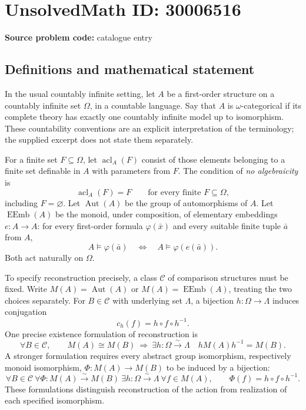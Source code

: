 \documentclass[11pt]{article}
\begin{document}
\section*{UnsolvedMath ID: 30006516}
\textbf{Source problem code:} catalogue entry
\subsection{Definitions and mathematical statement}
In the usual countably infinite setting, let \(A\) be a first-order structure on a countably infinite set \(\Omega\), in a countable language. Say that \(A\) is \(\omega\)-categorical if its complete theory has exactly one countably infinite model up to isomorphism. These countability conventions are an explicit interpretation of the terminology; the supplied excerpt does not state them separately.

For a finite set \(F\subseteq\Omega\), let \(\operatorname{acl}_A(F)\) consist of those elements belonging to a finite set definable in \(A\) with parameters from \(F\). The condition of \emph{no algebraicity} is
\[
\operatorname{acl}_A(F)=F\qquad\text{for every finite }F\subseteq\Omega,
\]
including \(F=\varnothing\). Let \(\operatorname{Aut}(A)\) be the group of automorphisms of \(A\). Let \(\operatorname{EEmb}(A)\) be the monoid, under composition, of elementary embeddings \(e:A\to A\): for every first-order formula \(\varphi(\bar x)\) and every suitable finite tuple \(\bar a\) from \(A\),
\[
A\models\varphi(\bar a)\quad\Longleftrightarrow\quad A\models\varphi(e(\bar a)).
\]
Both act naturally on \(\Omega\).

To specify reconstruction precisely, a class \(\mathcal C\) of comparison structures must be fixed. Write \(M(A)=\operatorname{Aut}(A)\) or \(M(A)=\operatorname{EEmb}(A)\), treating the two choices separately. For \(B\in\mathcal C\) with underlying set \(\Lambda\), a bijection \(h:\Omega\to\Lambda\) induces conjugation
\[
c_h(f)=h\circ f\circ h^{-1}.
\]
One precise existence formulation of reconstruction is
\[
\forall B\in\mathcal C,\qquad
M(A)\cong M(B)\ \Longrightarrow\
\exists h:\Omega\xrightarrow{\sim}\Lambda\quad
hM(A)h^{-1}=M(B).
\]
A stronger formulation requires every abstract group isomorphism, respectively monoid isomorphism, \(\Phi:M(A)\to M(B)\) to be induced by a bijection:
\[
\forall B\in\mathcal C\ \forall\Phi:M(A)\xrightarrow{\sim}M(B)\ \exists h:\Omega\xrightarrow{\sim}\Lambda\ \forall f\in M(A),\qquad
\Phi(f)=h\circ f\circ h^{-1}.
\]
These formulations distinguish reconstruction of the action from realization of each specified isomorphism.
\end{document}
